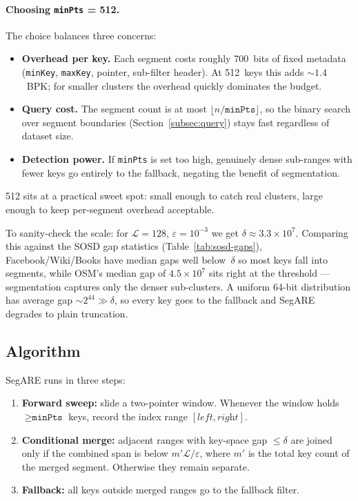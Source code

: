 \paragraph{Choosing \texttt{minPts} = 512.}
The choice balances three concerns:
\begin{itemize}
    \item \textbf{Overhead per key.} Each segment costs roughly 700~bits of fixed metadata
    (\texttt{minKey}, \texttt{maxKey}, pointer, sub-filter header).
    At 512~keys this adds $\sim 1.4$~BPK; for smaller clusters the overhead quickly
    dominates the budget.
    \item \textbf{Query cost.} The segment count is at most $\lfloor n/\texttt{minPts} \rfloor$,
    so the binary search over segment boundaries (Section~\ref{subsec:query}) stays fast
    regardless of dataset size.
    \item \textbf{Detection power.} If \texttt{minPts} is set too high, genuinely dense
    sub-ranges with fewer keys go entirely to the fallback, negating the benefit of
    segmentation.
\end{itemize}
512 sits at a practical sweet spot: small enough to catch real clusters, large enough to
keep per-segment overhead acceptable.

To sanity-check the scale: for $\mathcal{L} = 128$, $\varepsilon = 10^{-3}$ we get
$\delta \approx 3.3 \times 10^{7}$. Comparing this against the SOSD gap statistics
(Table~\ref{tab:sosd-gaps}), Facebook/Wiki/Books have median gaps well below~$\delta$
so most keys fall into segments, while OSM's median gap of $4.5 \times 10^{7}$ sits
right at the threshold --- segmentation captures only the denser sub-clusters.
A uniform 64-bit distribution has average gap ${\sim}2^{44} \gg \delta$, so every key
goes to the fallback and SegARE degrades to plain truncation.

\subsection{Algorithm}

SegARE runs in three steps:

\begin{enumerate}
    \item \textbf{Forward sweep:} slide a two-pointer window. Whenever the window holds
    $\geq \texttt{minPts}$ keys, record the index range $[\textit{left}, \textit{right}]$.
    \item \textbf{Conditional merge:} adjacent ranges with key-space gap $\leq \delta$ are
    joined only if the combined span is below $m'\mathcal{L}/\varepsilon$,
    where $m'$ is the total key count of the merged segment. Otherwise they remain separate.
    \item \textbf{Fallback:} all keys outside merged ranges go to the fallback filter.
\end{enumerate}

